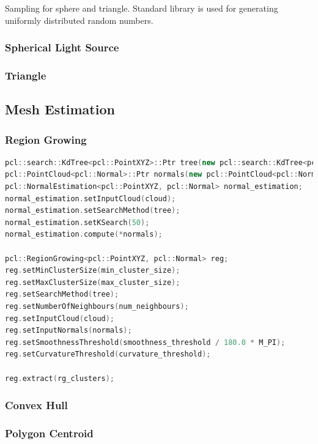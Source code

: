 \documentclass[11pt, a4paper,oneside,chapterprefix=false]{scrbook}
\begin{document}
Sampling for sphere and triangle. Standard library is used for generating uniformly distributed random numbers.

\subsubsection{Spherical Light Source}

\subsubsection{Triangle}

\subsection{Mesh Estimation} \label{sec:mesh estimation}

\subsubsection{Region Growing}

\begin{lstlisting}[language=C++, caption=Region Growing]
pcl::search::KdTree<pcl::PointXYZ>::Ptr tree(new pcl::search::KdTree<pcl::PointXYZ>());
pcl::PointCloud<pcl::Normal>::Ptr normals(new pcl::PointCloud<pcl::Normal>);
pcl::NormalEstimation<pcl::PointXYZ, pcl::Normal> normal_estimation;
normal_estimation.setInputCloud(cloud);
normal_estimation.setSearchMethod(tree);
normal_estimation.setKSearch(50);
normal_estimation.compute(*normals);

pcl::RegionGrowing<pcl::PointXYZ, pcl::Normal> reg;
reg.setMinClusterSize(min_cluster_size);
reg.setMaxClusterSize(max_cluster_size);
reg.setSearchMethod(tree);
reg.setNumberOfNeighbours(num_neighbours);
reg.setInputCloud(cloud);
reg.setInputNormals(normals);
reg.setSmoothnessThreshold(smoothness_threshold / 180.0 * M_PI);
reg.setCurvatureThreshold(curvature_threshold);

reg.extract(rg_clusters);
\end{lstlisting}

\subsubsection{Convex Hull}

\subsubsection{Polygon Centroid}
\end{document}
